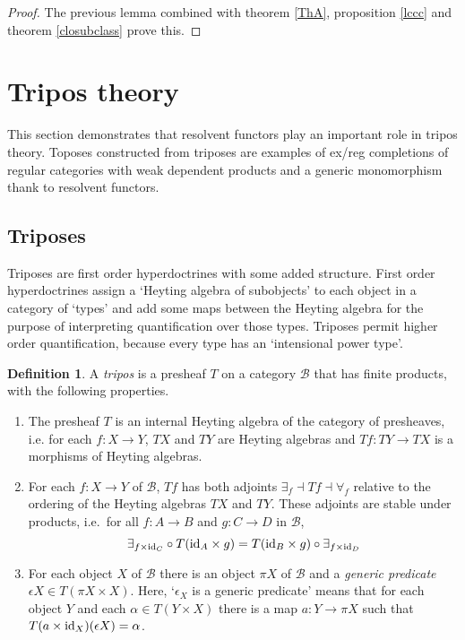 \documentclass[sort&compress]{elsarticle}
\theoremstyle{plain}
\theoremstyle{definition}
\newtheorem{defin}[theorem]{Definition}
\theoremstyle{remark}
\newcommand\hide[1]{}
\newcommand\cat\mathcal
\begin{document}
\begin{proof} The previous lemma combined with theorem \ref{ThA}, proposition \ref{lccc} and theorem \ref{closubclass} prove this. \end{proof}

\hide{Menni's vraag over $\cat L$ is hiermee ook beantwoord: als $\cat L$ een topos is, dan is hij $\cat C\exreg$, en daar volgt verder alles uit. }

\section{Tripos theory}
This section demonstrates that resolvent functors play an important role in tripos theory. Toposes constructed from triposes are examples of ex/reg completions of regular categories with weak dependent products and a generic monomorphism thank to resolvent functors.

\subsection{Triposes}\label{TriThe}
Triposes are first order hyperdoctrines with some added structure. First order hyperdoctrines assign a `Heyting algebra of subobjects' to each object in a category of `types' and add some maps between the Heyting algebra for the purpose of interpreting quantification over those types. Triposes permit higher order quantification, because every type has an `intensional power type'.

\begin{defin} A \emph{tripos} is a presheaf $T$ on a category $\cat B$ that has finite products, with the following properties.
\begin{enumerate}
\item The presheaf $T$ is an internal Heyting algebra of the category of presheaves, i.e. for each $f:X\to Y$, $TX$ and $TY$ are Heyting algebras and $Tf:TY\to TX$ is a morphisms of Heyting algebras.
\item For each $f:X\to Y$ of $\cat B$, $Tf$ has both adjoints $\exists_f\dashv Tf \dashv \forall_f$ relative to the ordering of the Heyting algebras $TX$ and $TY$. 
These adjoints are stable under products, i.e.\ for all $f:A\to B$ and $g:C\to D$ in $\cat B$, 
\[ \exists_{f\times \mathrm{id}_C}\circ T(\mathrm{id}_A\times g) = T(\mathrm{id}_B\times g)\circ \exists_{f\times \mathrm{id}_D} \]
\item For each object $X$ of $\cat B$ there is an object $\pi X$ of $\cat B$ and a \emph{generic predicate} $\epsilon X\in T(\pi X\times X)$. Here, `$\epsilon_X$ is a generic predicate' means that for each object $Y$ and each $\alpha\in T(Y\times X)$ there is a map $a:Y\to \pi X$ such that $T(a\times \mathrm{id}_X)(\epsilon X) = \alpha$.
\end{enumerate}
\end{defin}
\end{document}
